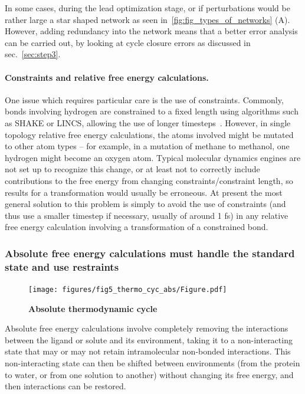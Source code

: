\documentclass[9pt,bestpractices]{livecoms}
\begin{document}
In some cases, during the lead optimization stage, or if perturbations would be rather large a star shaped network as seen in~\ref{fig:fig_types_of_networks} (A). However, adding redundancy into the network means that a better error analysis can be carried out, by looking at cycle closure errors as discussed in sec.~\ref{sec:step3}.


\paragraph{Constraints and relative free energy calculations.}
One issue which requires particular care is the use of constraints.
Commonly, bonds involving hydrogen are constrained to a fixed length using algorithms such as SHAKE or LINCS, allowing the use of longer timesteps~\cite{}.
However, in single topology relative free energy calculations, the atoms involved might be mutated to other atom types -- for example, in a mutation of methane to methanol, one hydrogen might become an oxygen atom.
Typical molecular dynamics engines are not set up to recognize this change, or at least not to correctly include contributions to the free energy from changing constraints/constraint length, so results for a transformation would usually be erroneous.
At present the most general solution to this problem is simply to avoid the use of constraints (and thus use a smaller timestep if necessary, usually of around 1 fs) in any relative free energy calculation involving a transformation of a constrained bond.

\subsubsection*{Absolute free energy calculations must handle the standard state and use restraints}
\label{sec:standardstate-restraints}

\begin{figure}
    \texttt{[image: figures/fig5\_thermo\_cyc\_abs/Figure.pdf]}
    \caption{\textbf{Absolute thermodynamic cycle}}
    \label{fig:fig_absolute_thermodynamic_cycle}
\end{figure}

Absolute free energy calculations involve completely removing the interactions between the ligand or solute and its environment, taking it to a non-interacting state that may or may not retain intramolecular non-bonded interactions.
This non-interacting state can then be shifted between environments (from the protein to water, or from one solution to another) without changing its free energy, and then interactions can be restored.
\end{document}
